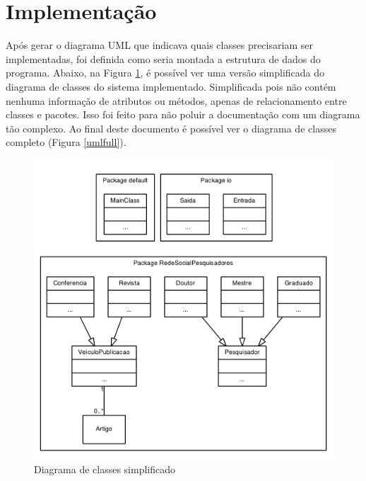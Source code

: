 \documentclass[12pt]{article}
\begin{document}
\section{Implementação}
\label{implementacao}

Após gerar o diagrama UML que indicava quais classes precisariam ser implementadas, foi definida como seria montada a estrutura de dados do programa. Abaixo, na Figura \ref{uml}, é possível ver uma versão simplificada do diagrama de classes do sistema implementado. Simplificada pois não contém nenhuma informação de atributos ou métodos, apenas de relacionamento entre classes e pacotes. Isso foi feito para não poluir a documentação com um diagrama tão complexo. Ao final deste documento é possível ver o diagrama de classes completo (Figura \ref{umlfull}).

\begin{figure}[h!]
	\centering
	\includegraphics[width=.8\textwidth]{umlsmall.png}
	\caption{Diagrama de classes simplificado}
	\label{uml}
\end{figure}
\end{document}
